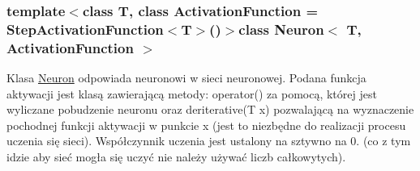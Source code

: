 \subsubsection*{template$<$class T, class Activation\-Function = \-Step\-Activation\-Function$<$\-T$>$()$>$class Neuron$<$ T, Activation\-Function $>$}

\-Klasa \hyperlink{class_neuron}{\-Neuron} odpowiada neuronowi w sieci neuronowej. \-Podana funkcja aktywacji jest klasą zawierającą metody\-: operator() za pomocą, której jest wyliczane pobudzenie neuronu oraz deriterative(\-T x) pozwalającą na wyznaczenie pochodnej funkcji aktywacji w punkcie x (jest to niezbędne do realizacji procesu uczenia się sieci). \-Współczynnik uczenia jest ustalony na sztywno na 0. (co z tym idzie aby sieć mogła się uczyć nie należy używać liczb całkowytych). 


